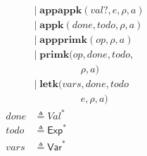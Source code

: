 \documentclass[12pt,draft]{article}
\begin{document}
\begin{multicols*}{2}
\begin{center}
\begin{align*}
        &|\; \textbf{appappk}(val?, e, \rho, a) \\
        &|\; \textbf{appk}(done, todo, \rho, a) \\
        &|\; \textbf{appprimk}(op, \rho, a) \\
        &|\; \textbf{primk}(op, done, todo, \\
        &\;\;\;\;\;\;\;\;\;\;\;\;\;\;\;\;\;\rho, a) \\
        &|\; \textbf{letk}(vars, done, todo \\
        &\;\;\;\;\;\;\;\;\;\;\;\;\;\;\;\;\;e, \rho, a) \\
done &\triangleq \textit{Val}^* \\
todo &\triangleq \textsf{Exp}^* \\
vars &\triangleq \textsf{Var}^*
\end{align*}
\end{center}
\end{multicols*}


\newpage
\end{document}
